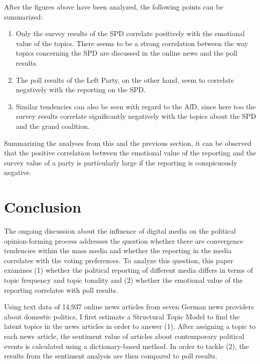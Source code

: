 \documentclass[12pt,a4paper,notitlepage]{article}
\begin{document}
After the figures above have been analyzed, the following points can be summarized:

\begin{enumerate}
	\item Only the survey results of the SPD correlate positively with the emotional value of the topics. There seems to be a strong correlation between the way topics concerning the SPD are discussed in the online news and the poll results.  
	\item The poll results of the Left Party, on the other hand, seem to correlate negatively with the reporting on the SPD. 
	\item Similar tendencies can also be seen with regard to the AfD, since here too the survey results correlate significantly negatively with the topics about the SPD and the grand coalition. 
\end{enumerate} 

Summarizing the analyses from this and the previous section, it can be observed that the positive correlation between the emotional value of the reporting and the survey value of a party is particularly large if the reporting is conspicuously negative. 

\section{Conclusion}

The ongoing discussion about the influence of digital media on the political opinion-forming process addresses the question whether there are convergence tendencies within the mass media and whether the reporting in the media correlates with the voting preferences. To analyze this question, this paper examines (1) whether the political reporting of different media differs in terms of topic frequency and topic tonality and (2) whether the emotional value of the reporting correlates with poll results. 

Using text data of 14,937 online news articles from seven German news providers about domestic politics, I first estimate a Structural Topic Model to find the latent topics in the news articles in order to answer (1). After assigning a topic to each news article, the sentiment value of articles about contemporary political events is calculated using a dictionary-based method. In order to tackle (2), the results from the sentiment analysis are then compared to poll results.
\end{document}
